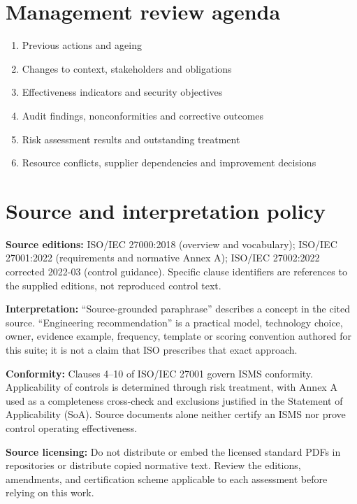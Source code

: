 \documentclass[11pt,letterpaper]{article}
\begin{document}
\section{Management review agenda}
\begin{enumerate}
\item Previous actions and ageing
\item Changes to context, stakeholders and obligations
\item Effectiveness indicators and security objectives
\item Audit findings, nonconformities and corrective outcomes
\item Risk assessment results and outstanding treatment
\item Resource conflicts, supplier dependencies and improvement decisions
\end{enumerate}

\clearpage\section*{Source and interpretation policy}
\textbf{Source editions:} ISO/IEC 27000:2018 (overview and vocabulary); ISO/IEC 27001:2022 (requirements and normative Annex A); ISO/IEC 27002:2022 corrected 2022-03 (control guidance). Specific clause identifiers are references to the supplied editions, not reproduced control text.\par
\textbf{Interpretation:} ``Source-grounded paraphrase'' describes a concept in the cited source. ``Engineering recommendation'' is a practical model, technology choice, owner, evidence example, frequency, template or scoring convention authored for this suite; it is not a claim that ISO prescribes that exact approach.\par
\textbf{Conformity:} Clauses 4--10 of ISO/IEC 27001 govern ISMS conformity. Applicability of controls is determined through risk treatment, with Annex A used as a completeness cross-check and exclusions justified in the Statement of Applicability (SoA). Source documents alone neither certify an ISMS nor prove control operating effectiveness.\par
\textbf{Source licensing:} Do not distribute or embed the licensed standard PDFs in repositories or distribute copied normative text. Review the editions, amendments, and certification scheme applicable to each assessment before relying on this work.\par
\end{document}
